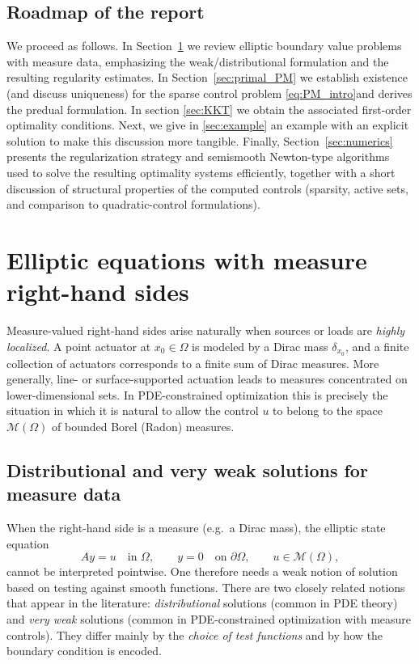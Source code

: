 \documentclass[11pt,a4paper]{article}
\begin{document}
\subsection{Roadmap of the report}
We proceed as follows.
In Section~\ref{sec:pde_measures} we review elliptic boundary value problems with measure data, emphasizing the weak/distributional formulation and the resulting regularity estimates.
In Section~\ref{sec:primal_PM} we establish existence (and discuss uniqueness) for the sparse control problem \eqref{eq:PM_intro}and derives the predual formulation. In section \ref{sec:KKT} we obtain the associated first-order optimality conditions. Next, we give in \ref{sec:example} an example with an explicit solution to make this discussion more tangible. Finally, Section~\ref{sec:numerics} presents the regularization strategy and semismooth Newton-type algorithms used to solve the resulting optimality systems efficiently, together with a short discussion of structural properties of the computed controls (sparsity, active sets, and comparison to quadratic-control formulations).

\section{Elliptic equations with measure right-hand sides}\label{sec:pde_measures}

Measure-valued right-hand sides arise naturally when sources or loads are
\emph{highly localized}.
A point actuator at $x_0\in\Omega$ is modeled by a Dirac mass $\delta_{x_0}$, and a
finite collection of actuators corresponds to a finite sum of Dirac measures.
More generally, line- or surface-supported actuation leads to measures concentrated
on lower-dimensional sets.
In PDE-constrained optimization this is precisely the situation in which it is natural
to allow the control $u$ to belong to the space $\mathcal{M}(\Omega)$ of bounded
Borel (Radon) measures. 

\subsection{Distributional and very weak solutions for measure data}\label{sec:dist_vs_veryweak}

When the right-hand side is a measure (e.g.\ a Dirac mass), the elliptic state equation
\[
Ay = u \quad\text{in }\Omega,\qquad y=0\quad\text{on }\partial\Omega,
\qquad u\in\mathcal{M}(\Omega),
\]
cannot be interpreted pointwise.
One therefore needs a weak notion of solution based on testing against smooth functions.
There are two closely related notions that appear in the literature:
\emph{distributional} solutions (common in PDE theory) and \emph{very weak} solutions
(common in PDE-constrained optimization with measure controls).
They differ mainly by the \emph{choice of test functions} and by how the boundary condition
is encoded.
\end{document}
